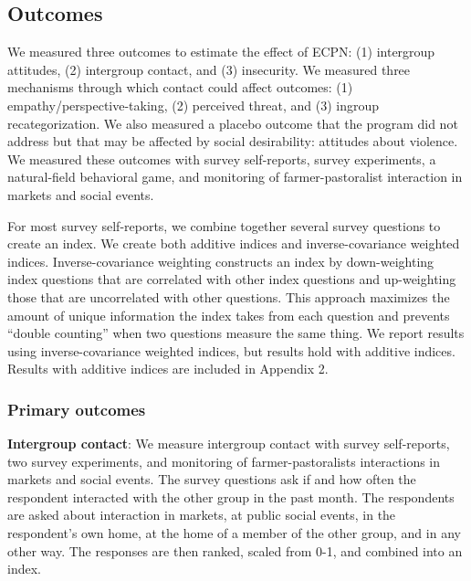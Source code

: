 \documentclass[11pt]{article}
\begin{document}
\hypertarget{outcomes}{%
\subsection{Outcomes}\label{outcomes}}

We measured three outcomes to estimate the effect of ECPN: (1)
intergroup attitudes, (2) intergroup contact, and (3) insecurity. We
measured three mechanisms through which contact could affect outcomes:
(1) empathy/perspective-taking, (2) perceived threat, and (3) ingroup
recategorization. We also measured a placebo outcome that the program
did not address but that may be affected by social desirability:
attitudes about violence. We measured these outcomes with survey
self-reports, survey experiments, a natural-field behavioral game, and
monitoring of farmer-pastoralist interaction in markets and social
events.

For most survey self-reports, we combine together several survey
questions to create an index. We create both additive indices and
inverse-covariance weighted indices. Inverse-covariance weighting
constructs an index by down-weighting index questions that are
correlated with other index questions and up-weighting those that are
uncorrelated with other questions. This approach maximizes the amount of
unique information the index takes from each question and prevents
``double counting'' when two questions measure the same thing. We report
results using inverse-covariance weighted indices, but results hold with
additive indices. Results with additive indices are included in Appendix
2.

\hypertarget{primary-outcomes}{%
\subsubsection{Primary outcomes}\label{primary-outcomes}}

\textbf{Intergroup contact}: We measure intergroup contact with survey
self-reports, two survey experiments, and monitoring of
farmer-pastoralists interactions in markets and social events. The
survey questions ask if and how often the respondent interacted with the
other group in the past month. The respondents are asked about
interaction in markets, at public social events, in the respondent's own
home, at the home of a member of the other group, and in any other way.
The responses are then ranked, scaled from 0-1, and combined into an
index.
\end{document}
